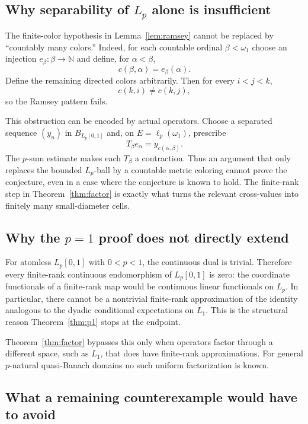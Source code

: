 \documentclass[11pt]{article}
\theoremstyle{definition}
\newcommand{\N}{\mathbb N}
\newcommand{\Lp}{L_p[0,1]}
\begin{document}
\subsection{Why separability of $L_p$ alone is insufficient}

The finite-color hypothesis in Lemma~\ref{lem:ramsey} cannot be replaced by
``countably many colors.''  Indeed, for each countable ordinal $\beta<\omega_1$
choose an injection $e_\beta:\beta\to\N$ and define, for $\alpha<\beta$,
\[
 c(\beta,\alpha)=e_\beta(\alpha).
\]
Define the remaining directed colors arbitrarily.  Then for every
$i<j<k$,
\[
 c(k,i)\neq c(k,j),
\]
so the Ramsey pattern fails.

This obstruction can be encoded by actual operators.  Choose a separated
sequence $(y_n)$ in $B_{\Lp}$ and, on $E=\ell_p(\omega_1)$, prescribe
\[
 T_\beta e_\alpha=y_{c(\alpha,\beta)}.
\]
The $p$-sum estimate makes each $T_\beta$ a contraction.  Thus an argument that
only replaces the bounded $L_p$-ball by a countable metric coloring cannot prove
the conjecture, even in a case where the conjecture is known to hold.  The
finite-rank step in Theorem~\ref{thm:factor} is exactly what turns the relevant
cross-values into finitely many small-diameter cells.

\subsection{Why the $p=1$ proof does not directly extend}

For atomless $L_p[0,1]$ with $0<p<1$, the continuous dual is trivial.  Therefore
every finite-rank continuous endomorphism of $L_p[0,1]$ is zero: the coordinate
functionals of a finite-rank map would be continuous linear functionals on
$L_p$.  In particular, there cannot be a nontrivial finite-rank approximation
of the identity analogous to the dyadic conditional expectations on $L_1$.
This is the structural reason Theorem~\ref{thm:p1} stops at the endpoint.

Theorem~\ref{thm:factor} bypasses this only when operators factor through a
different space, such as $L_1$, that does have finite-rank approximations.  For
general $p$-natural quasi-Banach domains no such uniform factorization is known.

\subsection{What a remaining counterexample would have to avoid}
\end{document}
